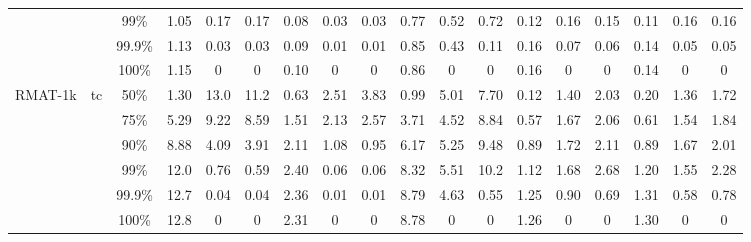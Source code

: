 \documentclass[sigconf,screen,review,natbib]{acmart}
\theoremstyle{definition}
\begin{document}
\begin{table*}
\begin{center}
\begin{tabular}{|c|c|c|c|c|c|c|c|c|c|c|c|c|c|c|c|c|c|}
			        &                         & 99\%   & 1.05                      & 0.17                                   & 0.17                       & 0.08                                    & 0.03                     & 0.03 & 0.77 & 0.52 & 0.72 & 0.12 & 0.16 & 0.15 & 0.11 & 0.16 & 0.16 \\
			        &                         & 99.9\% & 1.13                      & 0.03                                   & 0.03                       & 0.09                                    & 0.01                     & 0.01 & 0.85 & 0.43 & 0.11 & 0.16 & 0.07 & 0.06 & 0.14 & 0.05 & 0.05 \\
			        &                         & 100\%  & 1.15                      & 0                                      & 0                          & 0.10                                    & 0                        & 0    & 0.86 & 0    & 0    & 0.16 & 0    & 0    & 0.14 & 0    & 0    \\
			\hline
			RMAT-1k & \multirow{6}{*}{tc}     & 50\%   & 1.30                      & 13.0                                   & 11.2                       & 0.63                                    & 2.51                     & 3.83 & 0.99 & 5.01 & 7.70 & 0.12 & 1.40 & 2.03 & 0.20 & 1.36 & 1.72 \\
			        &                         & 75\%   & 5.29                      & 9.22                                   & 8.59                       & 1.51                                    & 2.13                     & 2.57 & 3.71 & 4.52 & 8.84 & 0.57 & 1.67 & 2.06 & 0.61 & 1.54 & 1.84 \\
			        &                         & 90\%   & 8.88                      & 4.09                                   & 3.91                       & 2.11                                    & 1.08                     & 0.95 & 6.17 & 5.25 & 9.48 & 0.89 & 1.72 & 2.11 & 0.89 & 1.67 & 2.01 \\
			        &                         & 99\%   & 12.0                      & 0.76                                   & 0.59                       & 2.40                                    & 0.06                     & 0.06 & 8.32 & 5.51 & 10.2 & 1.12 & 1.68 & 2.68 & 1.20 & 1.55 & 2.28 \\
			        &                         & 99.9\% & 12.7                      & 0.04                                   & 0.04                       & 2.36                                    & 0.01                     & 0.01 & 8.79 & 4.63 & 0.55 & 1.25 & 0.90 & 0.69 & 1.31 & 0.58 & 0.78 \\
			        &                         & 100\%  & 12.8                      & 0                                      & 0                          & 2.31                                    & 0                        & 0    & 8.78 & 0    & 0    & 1.26 & 0    & 0    & 1.30 & 0    & 0    \\
			\hline
		\end{tabular}
	\end{center}
	\label{tab:mainbenchmark}
\end{table*}
\end{document}
